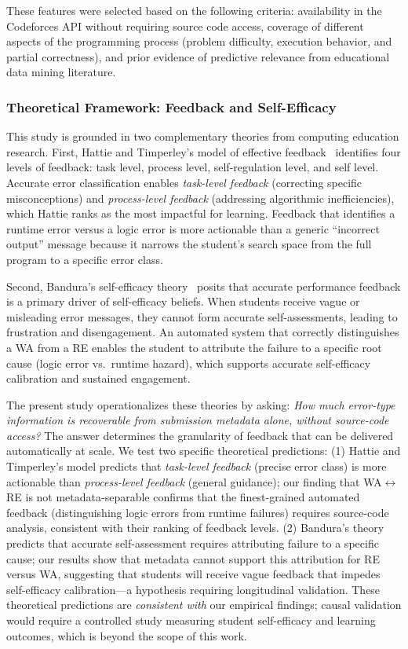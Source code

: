 \documentclass[acmsmall]{acmart}
\begin{document}
These features were selected based on the following criteria: availability in
the Codeforces API without requiring source code access, coverage of different
aspects of the programming process (problem difficulty, execution behavior,
and partial correctness), and prior evidence of predictive relevance from
educational data mining literature.

\subsubsection*{Theoretical Framework: Feedback and Self-Efficacy}

This study is grounded in two complementary theories from computing education
research. First, Hattie and Timperley's model of effective
feedback~\cite{hattie2007power} identifies four levels of feedback: task
level, process level, self-regulation level, and self level. Accurate error
classification enables \emph{task-level feedback} (correcting specific
misconceptions) and \emph{process-level feedback} (addressing algorithmic
inefficiencies), which Hattie ranks as the most impactful for learning.
Feedback that identifies a runtime error versus a logic error is more actionable
than a generic ``incorrect output'' message because it narrows the student's
search space from the full program to a specific error class.

Second, Bandura's self-efficacy theory~\cite{bandura1997self} posits that
accurate performance feedback is a primary driver of self-efficacy beliefs.
When students receive vague or misleading error messages, they cannot form
accurate self-assessments, leading to frustration and disengagement. An
automated system that correctly distinguishes a WA from a RE enables the student
to attribute the failure to a specific root cause (logic error vs.\ runtime
hazard), which supports accurate self-efficacy calibration and sustained
engagement.

The present study operationalizes these theories by asking: \textit{How much
error-type information is recoverable from submission metadata alone, without
source-code access?} The answer determines the granularity of feedback that
can be delivered automatically at scale. We test two specific theoretical
predictions: (1) Hattie and Timperley's model predicts that \emph{task-level
feedback} (precise error class) is more actionable than \emph{process-level
feedback} (general guidance); our finding that WA$\leftrightarrow$RE is not
metadata-separable confirms that the finest-grained automated feedback (distinguishing
logic errors from runtime failures) requires source-code analysis, consistent
with their ranking of feedback levels. (2) Bandura's theory predicts that
accurate self-assessment requires attributing failure to a specific cause; our
results show that metadata cannot support this attribution for RE versus WA,
suggesting that students will receive vague feedback that impedes self-efficacy
calibration---a hypothesis requiring longitudinal validation. These theoretical
predictions are \emph{consistent with} our empirical findings; causal validation
would require a controlled study measuring student self-efficacy and learning
outcomes, which is beyond the scope of this work.
\end{document}
